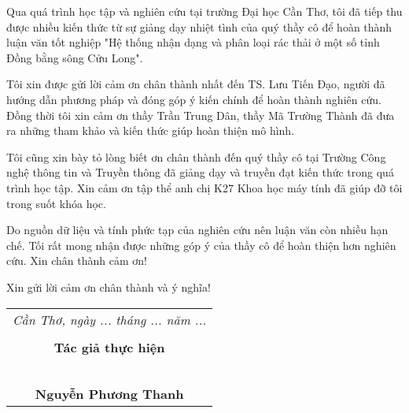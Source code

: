 \documentclass[./thesis.tex]{subfiles}
\begin{document}
{\fontsize{13}{12} \selectfont
Qua quá trình học tập và nghiên cứu tại trường Đại học Cần Thơ, tôi đã tiếp thu được nhiều kiến thức từ sự giảng dạy nhiệt tình của quý thầy cô để hoàn thành luận văn tốt nghiệp "Hệ thống nhận dạng và phân loại rác thải ở một số tỉnh Đồng bằng sông Cửu Long". 

}
\bigskip

{\fontsize{13}{12} \selectfont
Tôi xin được gửi lời cảm ơn chân thành nhất đến TS. Lưu Tiến Đạo, người đã hướng dẫn phương pháp và đóng góp ý kiến chính để hoàn thành nghiên cứu.
Đồng thời tôi xin cảm ơn thầy Trần Trung Dân, thầy Mã Trường Thành đã đưa ra những tham khảo và kiến thức giúp hoàn thiện mô hình.

}
\bigskip

{\fontsize{13}{12} \selectfont
Tôi cũng xin bày tỏ lòng biết ơn chân thành đến quý thầy cô tại Trường Công nghệ thông tin và Truyền thông đã giảng dạy và truyền đạt kiến thức trong quá trình học tập. Xin cảm ơn tập thể anh chị K27 Khoa học máy tính đã giúp đỡ tôi trong suốt khóa học.

}

\bigskip

{\fontsize{13}{12} \selectfont
Do nguồn dữ liệu và tính phức tạp của nghiên cứu nên luận văn còn nhiều hạn chế. Tối rất mong nhận được những góp ý của thầy cô để hoàn thiện hơn nghiên cứu.
Xin chân thành cảm ơn!

}

{\fontsize{13}{12} \selectfont
Xin gửi lời cảm ơn chân thành và ý nghĩa!

}

{\fontsize{13}{12} \selectfont
\hspace*{\fill}
\begin{tabular}{@{}c@{}} 

\\ \textit{Cần Thơ, ngày ... tháng ... năm ... } \\ \\
\textbf{Tác giả thực hiện}\\ \\
\\
\\
\\
\\
\textbf{Nguyễn Phương Thanh}
\end{tabular}

}
\end{document}
